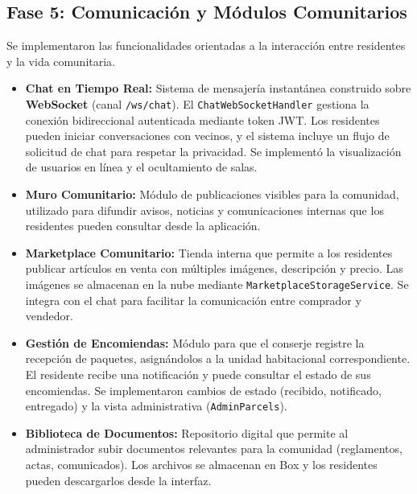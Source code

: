 \subsection{Fase 5: Comunicación y Módulos Comunitarios}
Se implementaron las funcionalidades orientadas a la interacción entre residentes y la vida comunitaria.
\begin{itemize}
    \item \textbf{Chat en Tiempo Real:} Sistema de mensajería instantánea construido sobre \textbf{WebSocket} (canal \texttt{/ws/chat}). El \texttt{ChatWebSocketHandler} gestiona la conexión bidireccional autenticada mediante token JWT. Los residentes pueden iniciar conversaciones con vecinos, y el sistema incluye un flujo de solicitud de chat para respetar la privacidad. Se implementó la visualización de usuarios en línea y el ocultamiento de salas.
    \item \textbf{Muro Comunitario:} Módulo de publicaciones visibles para la comunidad, utilizado para difundir avisos, noticias y comunicaciones internas que los residentes pueden consultar desde la aplicación.
    \item \textbf{Marketplace Comunitario:} Tienda interna que permite a los residentes publicar artículos en venta con múltiples imágenes, descripción y precio. Las imágenes se almacenan en la nube mediante \texttt{MarketplaceStorageService}. Se integra con el chat para facilitar la comunicación entre comprador y vendedor.
    \item \textbf{Gestión de Encomiendas:} Módulo para que el conserje registre la recepción de paquetes, asignándolos a la unidad habitacional correspondiente. El residente recibe una notificación y puede consultar el estado de sus encomiendas. Se implementaron cambios de estado (recibido, notificado, entregado) y la vista administrativa (\texttt{AdminParcels}).
    \item \textbf{Biblioteca de Documentos:} Repositorio digital que permite al administrador subir documentos relevantes para la comunidad (reglamentos, actas, comunicados). Los archivos se almacenan en Box y los residentes pueden descargarlos desde la interfaz.
\end{itemize}

